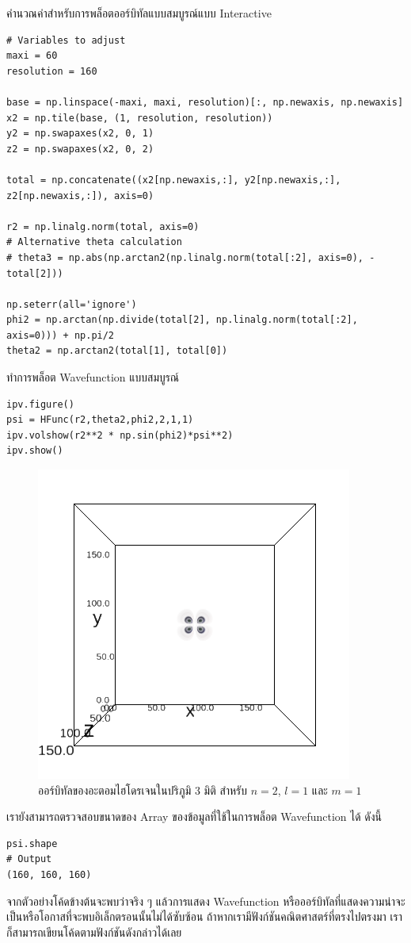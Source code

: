 \noindent คำนวณค่าสำหรับการพล็อตออร์บิทัลแบบสมบูรณ์แบบ Interactive

\begin{lstlisting}[style=MyPython]
# Variables to adjust
maxi = 60
resolution = 160

base = np.linspace(-maxi, maxi, resolution)[:, np.newaxis, np.newaxis]
x2 = np.tile(base, (1, resolution, resolution))
y2 = np.swapaxes(x2, 0, 1)
z2 = np.swapaxes(x2, 0, 2)

total = np.concatenate((x2[np.newaxis,:], y2[np.newaxis,:], z2[np.newaxis,:]), axis=0)

r2 = np.linalg.norm(total, axis=0)
# Alternative theta calculation
# theta3 = np.abs(np.arctan2(np.linalg.norm(total[:2], axis=0), -total[2]))

np.seterr(all='ignore')
phi2 = np.arctan(np.divide(total[2], np.linalg.norm(total[:2], axis=0))) + np.pi/2
theta2 = np.arctan2(total[1], total[0])
\end{lstlisting}

\noindent ทำการพล็อต Wavefunction แบบสมบูรณ์

\begin{lstlisting}[style=MyPython]
ipv.figure()
psi = HFunc(r2,theta2,phi2,2,1,1)
ipv.volshow(r2**2 * np.sin(phi2)*psi**2)
ipv.show()
\end{lstlisting}

\begin{figure}[H]
    \centering
    \includegraphics[width=0.8\linewidth]{fig/wfn_hydro_3d_n2_l1_m1.png}
    \caption{ออร์บิทัลของอะตอมไฮโดรเจนในปริภูมิ 3 มิติ สำหรับ $n = 2$, $l = 1$ และ $m = 1$}
    \label{fig:wfn_hydro_3d_n2_l1_m1}
\end{figure}

\noindent เรายังสามารถตรวจสอบขนาดของ Array ของข้อมูลที่ใช้ในการพล็อต Wavefunction ได้ ดังนี้

\begin{lstlisting}[style=MyPython]
psi.shape
# Output
(160, 160, 160)
\end{lstlisting}

\bigskip

จากตัวอย่างโค้ดข้างต้นจะพบว่าจริง ๆ แล้วการแสดง Wavefunction หรือออร์บิทัลที่แสดงความน่าจะเป็นหรือโอกาสที่จะพบอิเล็กตรอนนั้นไม่ได้ซับซ้อน ถ้าหากเรามีฟังก์ชันคณิตศาสตร์ที่ตรงไปตรงมา เราก็สามารถเขียนโค้ดตามฟังก์ชันดังกล่าวได้เลย
